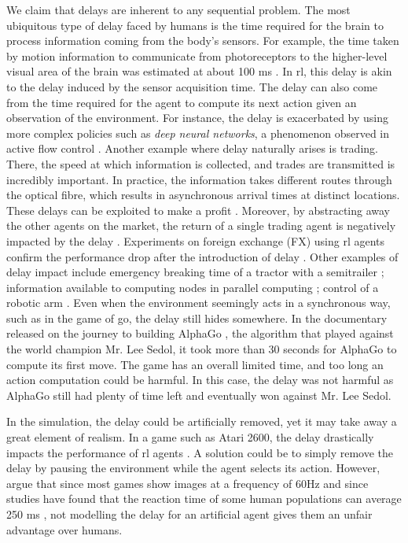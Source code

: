 We claim that delays are inherent to any sequential problem. 
The most ubiquitous type of delay faced by humans is the time required for the brain to process information coming from the body's sensors. 
For example, the time taken by motion information to communicate from photoreceptors to the higher-level visual area of the brain was estimated at about 100 ms \cite{de1991vernier}. 
In \gls{rl}, this delay is akin to the delay induced by the sensor acquisition time. 
The delay can also come from the time required for the agent to compute its next action given an observation of the environment.
For instance, the delay is exacerbated by using more complex policies such as \emph{deep neural networks}, a phenomenon observed in active flow control \cite{ren2021applying,mao2022active}.
Another example where delay naturally arises is trading. There, the speed at which information is collected, and trades are transmitted is incredibly important. 
In practice, the information takes different routes through the optical fibre, which results in asynchronous arrival times at distinct locations. 
These delays can be exploited to make a profit \cite{lewis2014flash}.
Moreover, by abstracting away the other agents on the market, the return of a single trading agent is negatively impacted by the delay \cite{wilcox1993effect}.
Experiments on foreign exchange (FX) using \gls{rl} agents confirm the performance drop after the introduction of delay \cite{liotet2022delayed}.
Other examples of delay impact include emergency breaking time of a tractor with a semitrailer \cite{bayan2010brake}; information available to computing nodes in parallel computing \cite{hannah2018unbounded}; control of a robotic arm \cite{mahmood2018setting}.
Even when the environment seemingly acts in a synchronous way, such as in the game of go, the delay still hides somewhere. 
In the documentary released on the journey to building AlphaGo \cite{silver2016mastering}, the algorithm that played against the world champion Mr. Lee Sedol, it took more than 30 seconds for AlphaGo to compute its first move. 
The game has an overall limited time, and too long an action computation could be harmful. 
In this case, the delay was not harmful as AlphaGo still had plenty of time left and eventually won against Mr. Lee Sedol.

In the simulation, the delay could be artificially removed, yet it may take away a great element of realism.
In a game such as Atari 2600, the delay drastically impacts the performance of \gls{rl} agents \cite{firoiu2018human}. 
A solution could be to simply remove the delay by pausing the environment while the agent selects its action.
However, \cite{firoiu2018human} argue that since most games show images at a frequency of 60Hz and since studies have found that the reaction time of some human populations can average 250 ms \cite{jain2015comparative}, not modelling the delay for an artificial agent gives them an unfair advantage over humans.

